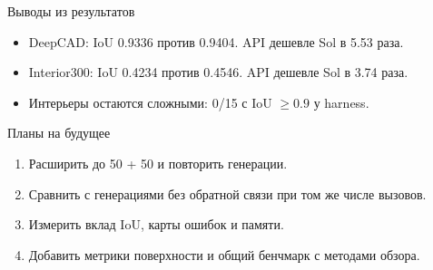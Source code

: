 \begin{frame}{Выводы из результатов}\relax
\begin{itemize}
\item DeepCAD: IoU 0.9336 против 0.9404.
API дешевле Sol в 5.53 раза.
\par\medskip
\item Interior300: IoU 0.4234 против 0.4546.
API дешевле Sol в 3.74 раза.
\par\medskip
\item Интерьеры остаются сложными: 0/15 с IoU $\geq0.9$ у harness.
\end{itemize}
\end{frame}
\begin{frame}{Планы на будущее}\relax
\begin{enumerate}
\item Расширить до 50 + 50 и повторить генерации.
\par\medskip
\item Сравнить с генерациями без обратной связи при том же числе вызовов.
\par\medskip
\item Измерить вклад IoU, карты ошибок и памяти.
\par\medskip
\item Добавить метрики поверхности и общий бенчмарк с методами обзора.
\end{enumerate}
\end{frame}
